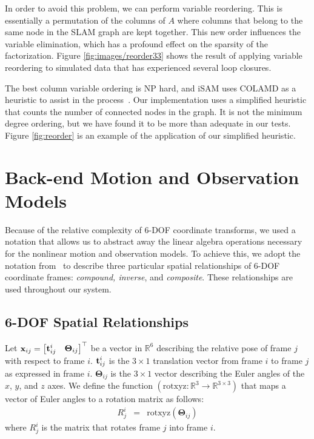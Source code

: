 \documentclass[conference]{IEEEtran}
\begin{document}
In order to avoid this problem, we can perform variable reordering. This is essentially a
permutation of the columns of $A$ where columns that belong to the same node in the \ac{SLAM}
graph are kept together. This new order influences the variable elimination, which
has a profound effect on the sparsity of the factorization. Figure
\ref{fig:images/reorder33} shows the result of applying variable reordering to simulated
data that has experienced several loop closures.

The best column variable ordering is NP hard, and iSAM uses COLAMD as a heuristic to
assist in the process~\cite{davis2004column}. Our implementation uses a simplified
heuristic that counts the number of connected nodes in the graph. It is not the minimum
degree ordering, but we have found it to be more than adequate in our tests. Figure
\ref{fig:reorder} is an example of the application of our simplified heuristic.

\section{Back-end Motion and Observation Models}
\label{sec:backendModels}

Because of the relative complexity of 6-\ac{DOF} coordinate transforms, we used a notation
that allows us to abstract away the linear algebra operations necessary for the nonlinear
motion and observation models. To achieve this, we adopt the notation
from~\cite{rsmith-1990a,reustice-phdthesis} to describe three particular spatial
relationships of 6-\ac{DOF} coordinate frames: {\it compound, inverse}, and {\it
  composite}. These relationships are used throughout our system.


\subsection{6-\ac{DOF} Spatial Relationships}
\label{sec:6dof}


Let ${\bf x}_{ij} = \begin{bmatrix}
  {\bf t}_{ij}^i & {\boldsymbol \Theta}_{ij}\\
\end{bmatrix}^\top$ be a vector in $\mathbb{R}^6$ describing the
relative pose of frame $j$ with respect to frame $i$.  ${\bf
  t}_{ij}^i$ is the $3\times 1$ translation vector from frame $i$ to
frame $j$ as expressed in frame $i$.  ${\boldsymbol \Theta}_{ij}$ is
the $3 \times 1$ vector describing the Euler angles of the $x$, $y$,
and $z$ axes.  We define the function $(\text{rotxyz}: \mathbb{R}^3
\rightarrow \mathbb{R}^{3\times3})$ that maps a vector of Euler angles to
a rotation matrix as follows:
\begin{eqnarray*}
  R_j^i & = & \text{rotxyz}({\boldsymbol \Theta}_{ij})
\end{eqnarray*}
where $R_j^i$ is the matrix that rotates frame $j$ into frame $i$.
\end{document}
